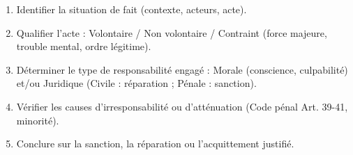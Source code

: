 \documentclass[11pt]{article}
\begin{document}
\begin{aretenir}
\begin{enumerate}
\begin{enumerate}
      \item Identifier la situation de fait (contexte, acteurs, acte).
      \item Qualifier l'acte : Volontaire / Non volontaire / Contraint (force majeure, trouble mental, ordre légitime).
      \item Déterminer le type de responsabilité engagé : Morale (conscience, culpabilité) et/ou Juridique (Civile : réparation ; Pénale : sanction).
      \item Vérifier les causes d'irresponsabilité ou d'atténuation (Code pénal Art. 39-41, minorité).
      \item Conclure sur la sanction, la réparation ou l'acquittement justifié.
    \end{enumerate}
\end{enumerate}


\end{aretenir}
\end{document}
